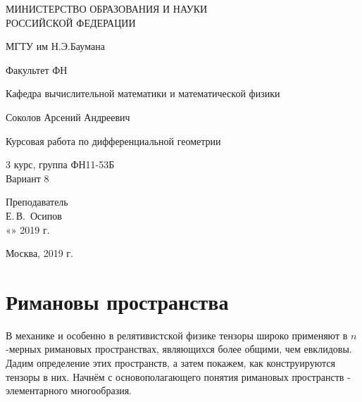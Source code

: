 \documentclass[14pt,a4paper]{extarticle}
\makeatletter
\renewcommand\tableofcontents{%
	\null\hfill\normalfont{\Large\contentsname}\hfill\null\par
	\@mkboth{\MakeUppercase\contentsname}{\MakeUppercase\contentsname}%
	\@starttoc{toc}%
}
\makeatother
\begin{document}
	\begin{titlepage}
	\begin{center}
		\large
		МИНИСТЕРСТВО ОБРАЗОВАНИЯ И НАУКИ\\ РОССИЙСКОЙ ФЕДЕРАЦИИ
		
		\vspace{0.5cm}
		
		МГТУ им Н.Э.Баумана
		\vspace{0.25cm}
		
		Факультет ФН
		
		Кафедра вычислительной математики и математической физики
		\vfill
		
		
		Соколов Арсений Андреевич\\
		\vfill
		
		
		{\LARGE Курсовая работа по дифференциальной геометрии\\[2mm]
		}
		\bigskip
		
		3 курс, группа ФН11-53Б\\
		Вариант 8
	\end{center}
	\vfill
	
	\newlength{\ML}
	\hfill\begin{minipage}{0.4\textwidth}
		Преподаватель\\
		\underline{\hspace{3cm}} Е.\,В.~Осипов\\
		«\underline{\hspace{0.7cm}}» \underline{\hspace{1.71cm}} 2019 г.
	\end{minipage}%
	\bigskip
	
	
	\vfill
	
	\begin{center}
		Москва, 2019 г.
	\end{center}
\end{titlepage}
\tableofcontents
\parindent=1.25cm
\clearpage



\section{Римановы пространства}
В механике и особенно в релятивистской физике тензоры широко применяют в $n$-мерных римановых пространствах, являющихся более общими, чем евклидовы. Дадим определение этих пространств, а затем покажем, как конструируются тензоры в них. Начнём с основополагающего понятия римановых пространств - элементарного многообразия.
\end{document}
